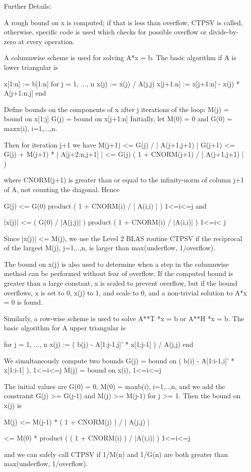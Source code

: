\begin{DoxyParagraph}{Further Details\+: }
\begin{DoxyVerb}  A rough bound on x is computed; if that is less than overflow, CTPSV
  is called, otherwise, specific code is used which checks for possible
  overflow or divide-by-zero at every operation.

  A columnwise scheme is used for solving A*x = b.  The basic algorithm
  if A is lower triangular is

       x[1:n] := b[1:n]
       for j = 1, ..., n
            x(j) := x(j) / A(j,j)
            x[j+1:n] := x[j+1:n] - x(j) * A[j+1:n,j]
       end

  Define bounds on the components of x after j iterations of the loop:
     M(j) = bound on x[1:j]
     G(j) = bound on x[j+1:n]
  Initially, let M(0) = 0 and G(0) = max{x(i), i=1,...,n}.

  Then for iteration j+1 we have
     M(j+1) <= G(j) / | A(j+1,j+1) |
     G(j+1) <= G(j) + M(j+1) * | A[j+2:n,j+1] |
            <= G(j) ( 1 + CNORM(j+1) / | A(j+1,j+1) | )

  where CNORM(j+1) is greater than or equal to the infinity-norm of
  column j+1 of A, not counting the diagonal.  Hence

     G(j) <= G(0) product ( 1 + CNORM(i) / | A(i,i) | )
                  1<=i<=j
  and

     |x(j)| <= ( G(0) / |A(j,j)| ) product ( 1 + CNORM(i) / |A(i,i)| )
                                   1<=i< j

  Since |x(j)| <= M(j), we use the Level 2 BLAS routine CTPSV if the
  reciprocal of the largest M(j), j=1,..,n, is larger than
  max(underflow, 1/overflow).

  The bound on x(j) is also used to determine when a step in the
  columnwise method can be performed without fear of overflow.  If
  the computed bound is greater than a large constant, x is scaled to
  prevent overflow, but if the bound overflows, x is set to 0, x(j) to
  1, and scale to 0, and a non-trivial solution to A*x = 0 is found.

  Similarly, a row-wise scheme is used to solve A**T *x = b  or
  A**H *x = b.  The basic algorithm for A upper triangular is

       for j = 1, ..., n
            x(j) := ( b(j) - A[1:j-1,j]' * x[1:j-1] ) / A(j,j)
       end

  We simultaneously compute two bounds
       G(j) = bound on ( b(i) - A[1:i-1,i]' * x[1:i-1] ), 1<=i<=j
       M(j) = bound on x(i), 1<=i<=j

  The initial values are G(0) = 0, M(0) = max{b(i), i=1,..,n}, and we
  add the constraint G(j) >= G(j-1) and M(j) >= M(j-1) for j >= 1.
  Then the bound on x(j) is

       M(j) <= M(j-1) * ( 1 + CNORM(j) ) / | A(j,j) |

            <= M(0) * product ( ( 1 + CNORM(i) ) / |A(i,i)| )
                      1<=i<=j

  and we can safely call CTPSV if 1/M(n) and 1/G(n) are both greater
  than max(underflow, 1/overflow).\end{DoxyVerb}
 
\end{DoxyParagraph}
